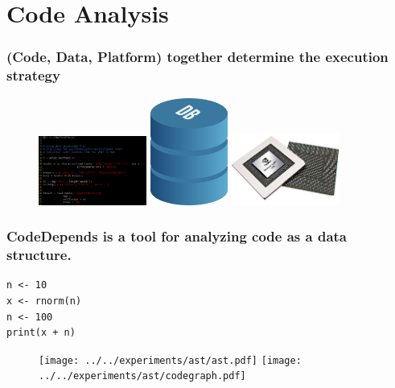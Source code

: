 \documentclass{beamer}
\begin{document}
\section{Code Analysis}
\begin{frame}

    \frametitle{(Code, Data, Platform) together determine the execution
    strategy}

\begin{figure}
            \includegraphics[width=1.4in]{code_screen.png}
            \hfill
            \includegraphics[width=1in]{database.png}
            \hfill
            \includegraphics[width=1.4in]{gpu.jpg}
\end{figure}


\end{frame}
\begin{frame}[fragile]

    \frametitle{CodeDepends is a tool for analyzing code as a data
    structure.}


\begin{verbatim}
n <- 10
x <- rnorm(n)
n <- 100
print(x + n)
\end{verbatim}

\begin{figure}
    \texttt{[image: ../../experiments/ast/ast.pdf]}
    \texttt{[image: ../../experiments/ast/codegraph.pdf]}
            \hfill
\end{figure}

\end{frame}
\end{document}
